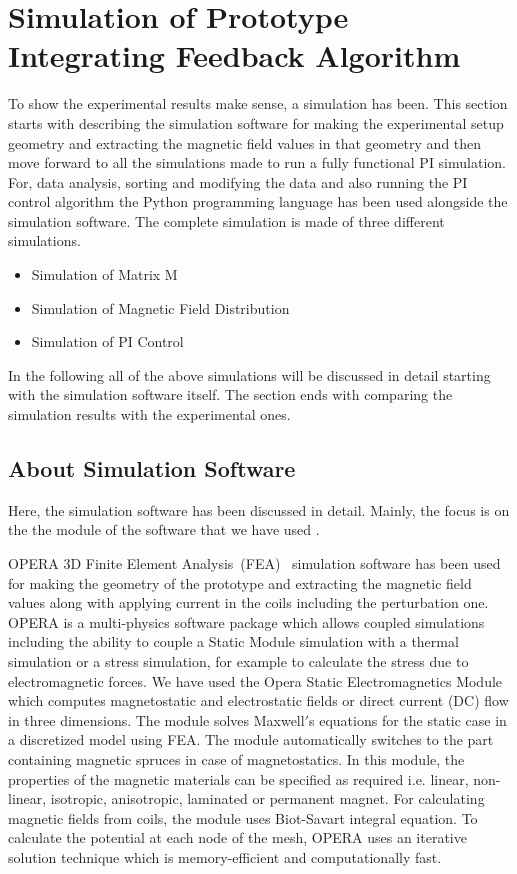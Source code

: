 \FloatBarrier
\section{Simulation of Prototype Integrating Feedback Algorithm}

To show the experimental results make sense, a simulation has been. This section starts with describing the simulation software for making the experimental setup geometry and extracting the magnetic field values in that geometry and then move forward to all the simulations made to run a fully functional PI simulation. For, data analysis, sorting  and modifying the data and also running the PI control algorithm the Python programming language has been used alongside the simulation software. The complete simulation is made of three different simulations. 

\begin{itemize}
    \item Simulation of Matrix M
    \item Simulation of Magnetic Field Distribution
    \item Simulation of PI Control
\end{itemize}
In the following  all of the above simulations  will be discussed in detail starting with the simulation software itself. The section ends with comparing the simulation results with the experimental ones.

\subsection{About Simulation Software}
Here, the simulation software has been discussed in detail. Mainly, the focus is on the the module of the software that we have used .

OPERA 3D Finite Element Analysis~(FEA)~\cite{opera} simulation software has been used for making the geometry of the prototype and extracting the magnetic field values along with applying current in the coils including the perturbation one. OPERA is a multi-physics software package which allows coupled simulations including the ability to couple a Static Module simulation with a thermal simulation or a stress simulation, for example to calculate the stress due to electromagnetic forces. We have used the Opera Static Electromagnetics Module which computes magnetostatic and electrostatic fields or direct current (DC) flow in three dimensions. The module solves Maxwell$'$s equations for the static case in a discretized model using FEA. The module automatically switches to the part containing magnetic spruces in case of magnetostatics. In this module, the properties of the magnetic materials can be specified as required i.e. linear, non-linear, isotropic, anisotropic, laminated or permanent magnet. For calculating magnetic fields from coils, the module uses Biot-Savart integral equation. To calculate the potential at each node of the mesh, OPERA uses an iterative solution technique which is memory-efficient and computationally fast.

